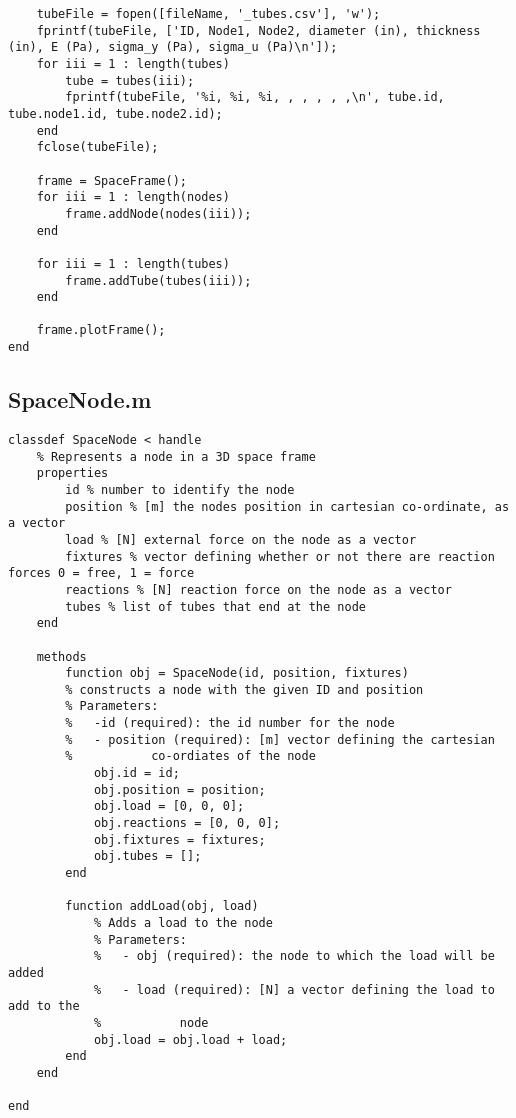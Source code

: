 \begin{lstlisting}
	tubeFile = fopen([fileName, '_tubes.csv'], 'w');
	fprintf(tubeFile, ['ID, Node1, Node2, diameter (in), thickness (in), E (Pa), sigma_y (Pa), sigma_u (Pa)\n']);
	for iii = 1 : length(tubes)
		tube = tubes(iii);
		fprintf(tubeFile, '%i, %i, %i, , , , , ,\n', tube.id, tube.node1.id, tube.node2.id);
	end
	fclose(tubeFile);
	
	frame = SpaceFrame();
	for iii = 1 : length(nodes)
		frame.addNode(nodes(iii));
	end
	
	for iii = 1 : length(tubes)
		frame.addTube(tubes(iii));
	end
	
	frame.plotFrame();
end

\end{lstlisting}
		\subsection{SpaceNode.m}
\begin{lstlisting}
classdef SpaceNode < handle
	% Represents a node in a 3D space frame
	properties
		id % number to identify the node
		position % [m] the nodes position in cartesian co-ordinate, as a vector
		load % [N] external force on the node as a vector
		fixtures % vector defining whether or not there are reaction forces 0 = free, 1 = force
		reactions % [N] reaction force on the node as a vector
		tubes % list of tubes that end at the node
	end
	
	methods
		function obj = SpaceNode(id, position, fixtures)
		% constructs a node with the given ID and position
		% Parameters:
		%   -id (required): the id number for the node
		%   - position (required): [m] vector defining the cartesian
		%           co-ordiates of the node
			obj.id = id;
			obj.position = position;
			obj.load = [0, 0, 0];
			obj.reactions = [0, 0, 0];
			obj.fixtures = fixtures;
			obj.tubes = [];
		end
		
		function addLoad(obj, load)
			% Adds a load to the node
			% Parameters:
			%   - obj (required): the node to which the load will be added
			%   - load (required): [N] a vector defining the load to add to the
			%           node
			obj.load = obj.load + load;
		end
	end

end

\end{lstlisting}

